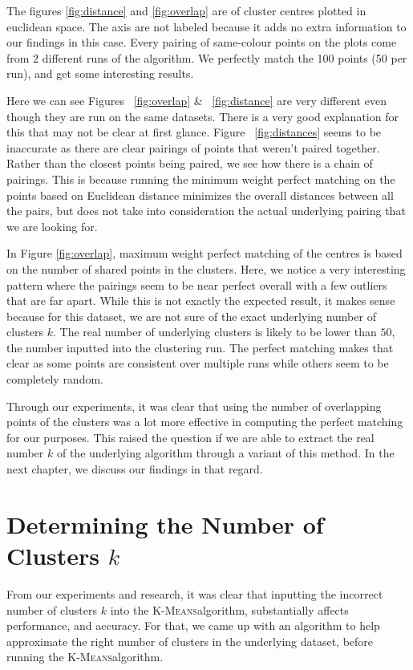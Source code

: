 \documentclass[12pt]{dalthesis}
\newcommand*{\kmeansn}{\textsc{K-Means}} %
\newcommand*{\kmeans}{\kmeansn } %
\begin{document}
The figures \ref{fig:distance} and \ref{fig:overlap} are of cluster centres plotted in euclidean space. The axis are not labeled because it adds no extra information to our findings in this case. Every pairing of same-colour points on the plots come from $2$ different runs of the algorithm. We perfectly match the 100 points (50 per run), and get some interesting results.

Here we can see Figures ~\ref{fig:overlap} \& ~\ref{fig:distance} are very different even though they are run on the same datasets. There is a very good explanation for this that may not be clear at first glance. Figure ~\ref{fig:distances} seems to be inaccurate as there are clear pairings of points that weren't paired together. Rather than the closest points being paired, we see how there is a chain of pairings. This is because running the minimum weight perfect matching on the points based on Euclidean distance minimizes the overall distances between all the pairs, but does not take into consideration the actual underlying pairing that we are looking for.

In Figure \ref{fig:overlap}, maximum weight perfect matching of the centres is based on the number of shared points in the clusters. Here, we notice a very interesting pattern where the pairings seem to be near perfect overall with a few outliers that are far apart. While this is not exactly the expected result, it makes sense because for this dataset, we are not sure of the exact underlying number of clusters $k$. The real number of underlying clusters is likely to be lower than  $50$, the number inputted into the clustering run. The perfect matching makes that clear as some points are consistent over multiple runs while others seem to be completely random.

Through our experiments, it was clear that using the number of overlapping points of the clusters was a lot more effective in computing the perfect matching for our purposes. This raised the question if we are able to extract the real number $k$ of the underlying algorithm through a variant of this method. In the next chapter, we discuss our findings in that regard. 

\chapter{Determining the Number of Clusters $k$}
From our experiments and research, it was clear that inputting the incorrect number of clusters $k$ into the \kmeans algorithm, substantially affects performance, and accuracy. For that, we came up with an algorithm to help approximate the right number of clusters in the underlying dataset, before running the \kmeans algorithm.
\end{document}
